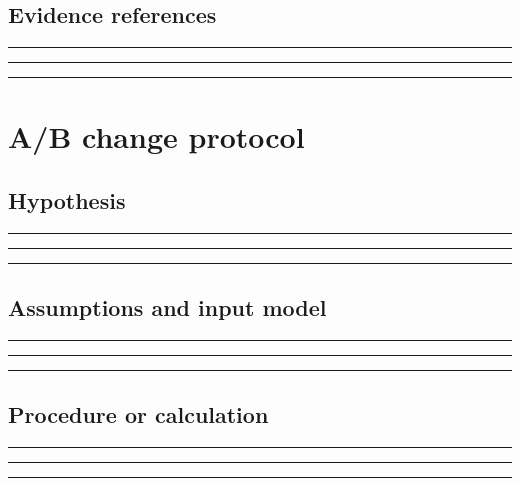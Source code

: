 \documentclass[11pt]{article}
\begin{document}
\subsection{Evidence references}
\noindent\rule{\linewidth}{0.35pt}\par\vspace{0.22in}
\noindent\rule{\linewidth}{0.35pt}\par\vspace{0.22in}
\noindent\rule{\linewidth}{0.35pt}\par\vspace{0.18in}
\clearpage

\section{A/B change protocol}

\subsection{Hypothesis}
\noindent\rule{\linewidth}{0.35pt}\par\vspace{0.22in}
\noindent\rule{\linewidth}{0.35pt}\par\vspace{0.22in}
\noindent\rule{\linewidth}{0.35pt}\par\vspace{0.18in}

\subsection{Assumptions and input model}
\noindent\rule{\linewidth}{0.35pt}\par\vspace{0.22in}
\noindent\rule{\linewidth}{0.35pt}\par\vspace{0.22in}
\noindent\rule{\linewidth}{0.35pt}\par\vspace{0.18in}

\subsection{Procedure or calculation}
\noindent\rule{\linewidth}{0.35pt}\par\vspace{0.22in}
\noindent\rule{\linewidth}{0.35pt}\par\vspace{0.22in}
\noindent\rule{\linewidth}{0.35pt}\par\vspace{0.18in}
\end{document}
